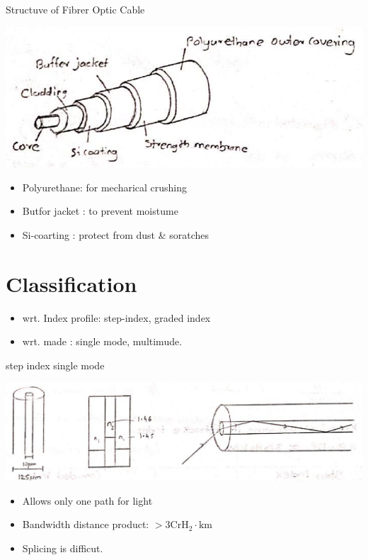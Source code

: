 \documentclass[10pt]{article}
\begin{document}
Structuve of Fibrer Optic Cable

\begin{center}
\includegraphics[max width=\textwidth]{2024_06_16_30d750483617f1939202g-05(2)}
\end{center}

\begin{itemize}
  \item Polyurethane: for mecharical crushing
  \item Butfor jacket : to prevent moistume
  \item Si-coarting : protect from dust \& soratches
\end{itemize}

\section*{Classification}
\begin{itemize}
  \item wrt. Index profile: step-index, graded index

  \item wrt. made : single mode, multimude.

\end{itemize}

step index single mode

\begin{center}
\includegraphics[max width=\textwidth]{2024_06_16_30d750483617f1939202g-05(1)}
\end{center}

\begin{itemize}
  \item Allows only one path for light
  \item Bandwidth distance product: $>3 \mathrm{CrH}_{2} \cdot \mathrm{km}$
  \item Splicing is difficut.
\end{itemize}
\end{document}
